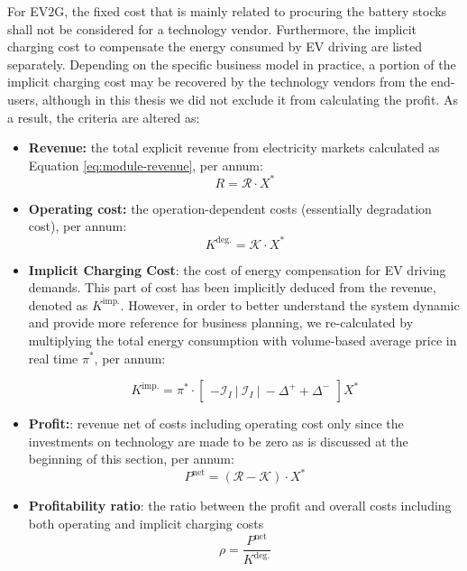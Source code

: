 For EV2G, the fixed cost that is mainly related to procuring the battery stocks shall not be considered for a technology vendor. Furthermore, the implicit charging cost to compensate the energy consumed by EV driving are listed separately. Depending on the specific business model in practice, a portion of the implicit charging cost may be recovered by the technology vendors from the end-users, although in this thesis we did not exclude it from calculating the profit. As a result, the criteria are altered as:
\begin{itemize}
	\item \textbf{Revenue:} the total explicit revenue from electricity markets calculated as Equation \eqref{eq:module-revenue}, per annum:
	\begin{equation*}
	R =  \mathcal{R} \cdot X^*
	\end{equation*}
	
	\item \textbf{Operating cost:} the operation-dependent costs (essentially degradation cost), per annum:
	\begin{equation*}
	K^{\text{deg.}} =  \mathcal{K} \cdot X^*
	\end{equation*}
	
	\item \textbf{Implicit Charging Cost}: the cost of energy compensation for EV driving demands. This part of cost has been implicitly deduced from the revenue, denoted as $K^{\text{imp.}}$. However, in order to better understand the system dynamic and provide more reference for business planning, we re-calculated by multiplying the total energy consumption with volume-based average price in real time $\pi^*$, per annum:
	
	\begin{equation*}
	K^{\text{imp.}} = \pi^* \cdot
	 \begin{bmatrix}
	 -\mathcal{I}_I~|~ \mathcal{I}_I ~|~ -\Delta^+ + \Delta^-
	\end{bmatrix} X^*
	\end{equation*}
	
	\item \textbf{Profit:}: revenue net of costs including operating cost only since the investments on technology are made to be zero as is discussed at the beginning of this section, per annum:
	\begin{equation*}
	P^{\text{net}} = \left( \mathcal{R} - \mathcal{K} \right) \cdot X^*
	\end{equation*}
	
	
	\item  \textbf{Profitability ratio}: the ratio between the profit and overall costs including both operating and implicit charging costs
	\begin{equation*}
	\rho = 	\frac{P^{\text{net}}}{K^{\text{deg.}}} %
	\end{equation*}
	
\end{itemize}

